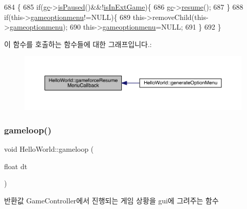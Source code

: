 \begin{DoxyCode}
684                                                         \{
685     \textcolor{keywordflow}{if}(\hyperlink{class_hello_world_a547cb213126911d9a7151f8259dc7102}{gc}->\hyperlink{class_tetris_1_1_game_controller_a18e513f45750361e14af091704e9f1d4}{isPaused}()&&!\hyperlink{class_hello_world_a6dcd196f83b5eba681717366944fcddf}{isInExtGame})\{
686         \hyperlink{class_hello_world_a547cb213126911d9a7151f8259dc7102}{gc}->\hyperlink{class_tetris_1_1_game_controller_ab9ff093ea91e3d248a8a287289e758b0}{resume}();
687     \}
688     \textcolor{keywordflow}{if}(this->\hyperlink{class_hello_world_aeb27a8750393a2d4982809b64454a045}{gameoptionmenu}!=NULL)\{
689         this->removeChild(this->\hyperlink{class_hello_world_aeb27a8750393a2d4982809b64454a045}{gameoptionmenu});
690         this->\hyperlink{class_hello_world_aeb27a8750393a2d4982809b64454a045}{gameoptionmenu}=NULL;
691     \}
692 \}
\end{DoxyCode}
이 함수를 호출하는 함수들에 대한 그래프입니다.\+:
\nopagebreak
\begin{figure}[H]
\begin{center}
\leavevmode
\includegraphics[width=350pt]{d9/d98/class_hello_world_a9765d6e42b96bcf6c025ae1905bd7a90_icgraph}
\end{center}
\end{figure}
\mbox{\label{class_hello_world_af59f38fb445c1302e5d2f7e18d0ab0e5}} 
\subsubsection{\texorpdfstring{gameloop()}{gameloop()}}
{\footnotesize\ttfamily void Hello\+World\+::gameloop (\begin{DoxyParamCaption}\item[{float}]{dt }\end{DoxyParamCaption})\hspace{0.3cm}{\ttfamily [protected]}}

\begin{DoxyReturn}{반환값}
Game\+Controller에서 진행되는 게임 상황을 gui에 그려주는 함수 
\end{DoxyReturn}


